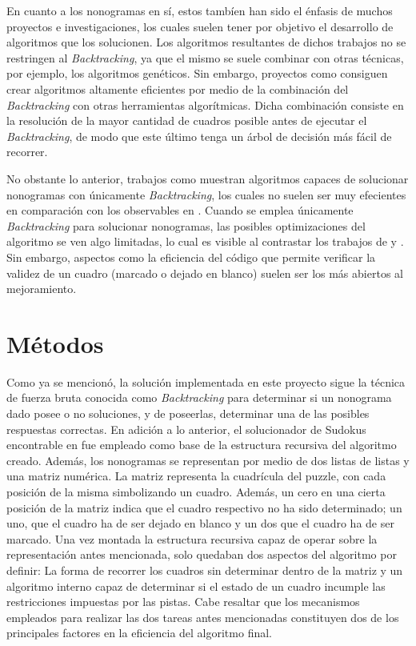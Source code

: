 \documentclass[conference]{IEEEtran}
\begin{document}
En cuanto a los nonogramas en sí, estos tambíen han sido el énfasis de muchos proyectos e investigaciones, los cuales suelen tener por objetivo el desarrollo de algoritmos que los solucionen. Los algoritmos resultantes de dichos trabajos no se restringen al \textit{Backtracking}, ya que el mismo se suele combinar con otras técnicas, por ejemplo, los algoritmos genéticos. Sin embargo, proyectos como \cite{b3} consiguen crear algoritmos altamente eficientes por medio de la combinación del \textit{Backtracking} con otras herramientas algorítmicas. Dicha combinación consiste en la resolución de la mayor cantidad de cuadros posible antes de ejecutar el \textit{Backtracking}, de modo que este último tenga un árbol de decisión más fácil de recorrer.

No obstante lo anterior, trabajos como \cite{b5} muestran algoritmos capaces de solucionar nonogramas con únicamente \textit{Backtracking}, los cuales no suelen ser muy efecientes en comparación con los observables en \cite{b3}. Cuando se emplea únicamente \textit{Backtracking} para solucionar nonogramas, las posibles optimizaciones del algoritmo se ven algo limitadas, lo cual es visible al contrastar los trabajos de \cite{b5} y \cite{b3}. Sin embargo, aspectos como la eficiencia del código que permite verificar la validez de un cuadro (marcado o dejado en blanco) suelen ser los más abiertos al mejoramiento.

\section{Métodos}
Como ya se mencionó, la solución implementada en este proyecto sigue la técnica de fuerza bruta conocida como \textit{Backtracking} para determinar si un nonograma dado posee o no soluciones, y de poseerlas, determinar una de las posibles respuestas correctas. En adición a lo anterior, el solucionador de Sudokus encontrable en \cite{b4} fue empleado como base de la estructura recursiva del algoritmo creado. Además, los nonogramas se representan por medio de dos listas de listas y una matriz numérica. La matriz representa la cuadrícula del puzzle, con cada posición de la misma simbolizando un cuadro. Además, un cero en una cierta posición de la matriz indica que el cuadro respectivo no ha sido determinado; un uno, que el cuadro ha de ser dejado en blanco y un dos que el cuadro ha de ser marcado. Una vez montada la estructura recursiva capaz de operar sobre la representación antes mencionada, solo quedaban dos aspectos del algoritmo por definir: La forma de recorrer los cuadros sin determinar dentro de la matriz y un algoritmo interno capaz de determinar si el estado de un cuadro incumple las restricciones impuestas por las pistas. Cabe resaltar que los mecanismos empleados para realizar las dos tareas antes mencionadas constituyen dos de los principales factores en la eficiencia del algoritmo final. 
\end{document}
